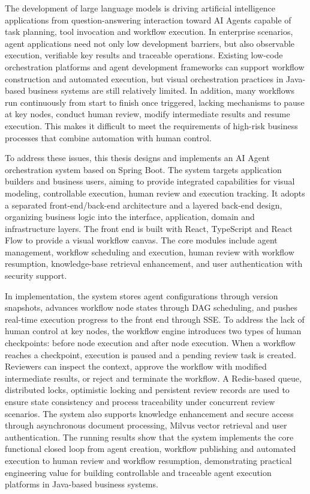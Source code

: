 \begin{abstracten}

The development of large language models is driving artificial intelligence applications from question-answering interaction toward AI Agents capable of task planning, tool invocation and workflow execution. In enterprise scenarios, agent applications need not only low development barriers, but also observable execution, verifiable key results and traceable operations. Existing low-code orchestration platforms and agent development frameworks can support workflow construction and automated execution, but visual orchestration practices in Java-based business systems are still relatively limited. In addition, many workflows run continuously from start to finish once triggered, lacking mechanisms to pause at key nodes, conduct human review, modify intermediate results and resume execution. This makes it difficult to meet the requirements of high-risk business processes that combine automation with human control.

To address these issues, this thesis designs and implements an AI Agent orchestration system based on Spring Boot. The system targets application builders and business users, aiming to provide integrated capabilities for visual modeling, controllable execution, human review and execution tracking. It adopts a separated front-end/back-end architecture and a layered back-end design, organizing business logic into the interface, application, domain and infrastructure layers. The front end is built with React, TypeScript and React Flow to provide a visual workflow canvas. The core modules include agent management, workflow scheduling and execution, human review with workflow resumption, knowledge-base retrieval enhancement, and user authentication with security support.

In implementation, the system stores agent configurations through version snapshots, advances workflow node states through DAG scheduling, and pushes real-time execution progress to the front end through SSE. To address the lack of human control at key nodes, the workflow engine introduces two types of human checkpoints: before node execution and after node execution. When a workflow reaches a checkpoint, execution is paused and a pending review task is created. Reviewers can inspect the context, approve the workflow with modified intermediate results, or reject and terminate the workflow. A Redis-based queue, distributed locks, optimistic locking and persistent review records are used to ensure state consistency and process traceability under concurrent review scenarios. The system also supports knowledge enhancement and secure access through asynchronous document processing, Milvus vector retrieval and user authentication. The running results show that the system implements the core functional closed loop from agent creation, workflow publishing and automated execution to human review and workflow resumption, demonstrating practical engineering value for building controllable and traceable agent execution platforms in Java-based business systems.


\end{abstracten}

\clearpage
